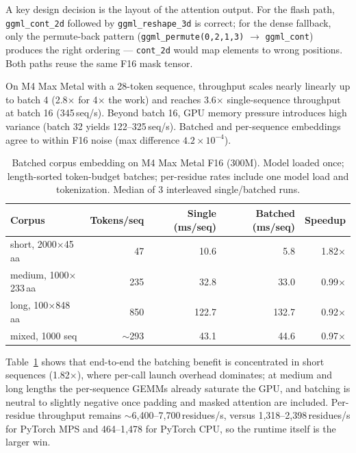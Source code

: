 \documentclass{article}
\begin{document}
A key design decision is the layout of the attention output. For the flash path, \texttt{ggml\_cont\_2d} followed by \texttt{ggml\_reshape\_3d} is correct; for the dense fallback, only the permute-back pattern (\texttt{ggml\_permute(0,2,1,3)} $\to$ \texttt{ggml\_cont}) produces the right ordering --- \texttt{cont\_2d} would map elements to wrong positions. Both paths reuse the same F16 mask tensor.

On M4 Max Metal with a 28-token sequence, throughput scales nearly linearly up to batch 4 (2.8$\times$ for 4$\times$ the work) and reaches 3.6$\times$ single-sequence throughput at batch 16 (345\,seq/s). Beyond batch 16, GPU memory pressure introduces high variance (batch 32 yields 122--325\,seq/s). Batched and per-sequence embeddings agree to within F16 noise (max difference $4.2 \times 10^{-4}$).

\begin{table}
  \centering
  \caption{Batched corpus embedding on M4 Max Metal F16 (300M). Model loaded once; length-sorted token-budget batches; per-residue rates include one model load and tokenization. Median of 3 interleaved single/batched runs.}
  \label{tab:batching}
  \begin{tabular}{lrrrr}
    \toprule
    Corpus & Tokens/seq & Single (ms/seq) & Batched (ms/seq) & Speedup \\
    \midrule
    short, 2000$\times$45\,aa   & 47        & 10.6  & 5.8   & 1.82$\times$ \\
    medium, 1000$\times$233\,aa & 235       & 32.8  & 33.0  & 0.99$\times$ \\
    long, 100$\times$848\,aa    & 850       & 122.7 & 132.7 & 0.92$\times$ \\
    mixed, 1000 seq             & $\sim$293 & 43.1  & 44.6  & 0.97$\times$ \\
    \bottomrule
  \end{tabular}
\end{table}

Table~\ref{tab:batching} shows that end-to-end the batching benefit is concentrated in short sequences (1.82$\times$), where per-call launch overhead dominates; at medium and long lengths the per-sequence GEMMs already saturate the GPU, and batching is neutral to slightly negative once padding and masked attention are included. Per-residue throughput remains $\sim$6{,}400--7{,}700\,residues/s, versus 1{,}318--2{,}398\,residues/s for PyTorch MPS and 464--1{,}478 for PyTorch CPU, so the runtime itself is the larger win.
\end{document}
